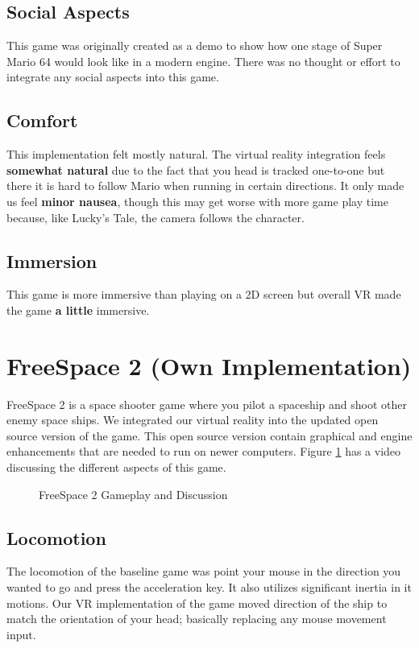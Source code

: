 \documentclass[journal]{IEEEtran}
\begin{document}
\subsection{Social Aspects}
This game was originally created as a demo to show how one stage of Super Mario 64 would look like in a modern engine. There was no thought or effort to integrate any social aspects into this game. 

\subsection{Comfort}
This implementation felt mostly natural. The virtual reality integration feels \textbf{somewhat natural} due to the fact that you head is tracked one-to-one but there it is hard to follow Mario when running in certain directions. It only made us feel \textbf{minor nausea}, though this may get worse with more game play time because, like Lucky's Tale, the camera follows the character. 

\subsection{Immersion}
This game is more immersive than playing on a 2D screen but overall VR made the game \textbf{a little} immersive. 

\section{FreeSpace 2 (Own Implementation)}
FreeSpace 2 is a space shooter game where you pilot a spaceship and shoot other enemy space ships. We integrated our virtual reality into the updated open source version of the game. This open source version contain graphical and engine enhancements that are needed to run on newer computers. Figure \ref{FS2_Gameplay} has a video discussing the different aspects of this game.  
 
\begin{figure}[h]
	\centering
		\caption{FreeSpace 2 Gameplay and Discussion}
		\label{FS2_Gameplay}
\end{figure}
\subsection{Locomotion}
The locomotion of the baseline game was point your mouse in the direction you wanted to go and press the acceleration key. It also utilizes significant inertia in it motions. Our VR implementation of the game moved direction of the ship to match the orientation of your head; basically replacing any mouse movement input. 
\end{document}
